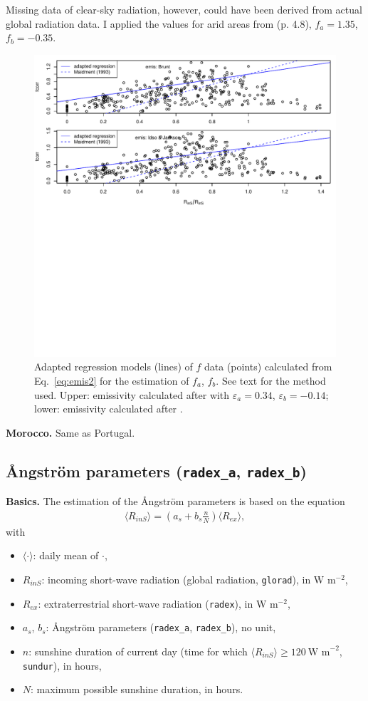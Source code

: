 \documentclass{scrreprt}
\newenvironment{denseitem}{
  \begin{itemize}
    \setlength{\itemsep}{0pt}
    \setlength{\parskip}{0pt}
    \setlength{\parsep}{0pt}
}{
  \end{itemize}
}
\begin{document}
Missing data of clear-sky radiation, however, could have been derived from actual global radiation data.
I applied the values for arid areas from \citet{maidment93} (p. 4.8), $f_a = 1.35$, $f_b = -0.35$.

\begin{figure}[ht]
  \centering
  \includegraphics[width=0.6\hsize]{./plot_fcorr_both.pdf}
  \caption{Adapted regression models (lines) of $f$ data (points) calculated from Eq.~\eqref{eq:emis2} for the estimation of $f_a$, $f_b$.
           See text for the method used.
           Upper: emissivity calculated after \citet{brunt32} with $\varepsilon_a = 0.34$, $\varepsilon_b = -0.14$; lower: emissivity calculated after \citet{idso69}.}
  \label{fig:portugal_fcorr}
\end{figure}

\textbf{Morocco.}
Same as Portugal.

\subsection{{\AA}ngstr\"om parameters (\texttt{radex\_a}, \texttt{radex\_b})} \label{ssec:parest_rad_radex}

\textbf{Basics.}
The estimation of the {\AA}ngstr\"om parameters is based on the equation
\begin{align} \label{eq:radex1}
  \langle R_{inS} \rangle = \left (  a_s + b_s \frac{n}{N} \right ) \langle R_{ex} \rangle,
\end{align}
%
with
\begin{denseitem}
  \item[] $\langle \cdot \rangle$: daily mean of $\cdot$,
  \item[] $R_{inS}$: incoming short-wave radiation (global radiation, \verb!glorad!), in W m$^{-2}$,
  \item[] $R_{ex}$: extraterrestrial short-wave radiation (\verb!radex!), in W m$^{-2}$,
  \item[] $a_s$, $b_s$: {\AA}ngstr\"om parameters (\verb!radex_a!, \verb!radex_b!), no unit,
  \item[] $n$: sunshine duration of current day (time for which $\langle R_{inS} \rangle \geq 120~\text{W~m}^{-2}$, \verb!sundur!), in hours,
  \item[] $N$: maximum possible sunshine duration, in hours.
\end{denseitem}
\end{document}
